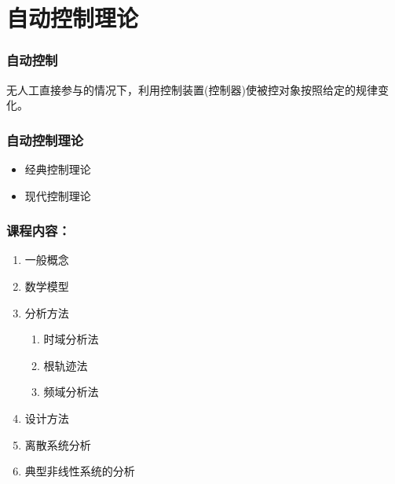 \documentclass{beamer}
\begin{document}
\section{自动控制理论}
\label{sec-2}
\begin{frame}
\frametitle{自动控制}
\label{sec-2-1}

 无人工直接参与的情况下，利用控制装置(控制器)使被控对象按照给定的规律变化。
\end{frame}
\begin{frame}
\frametitle{自动控制理论}
\label{sec-2-2}

\begin{itemize}
\item <2->经典控制理论
\item <3->现代控制理论
\end{itemize}
\end{frame}
\begin{frame}
\frametitle{课程内容：}
\label{sec-2-3}

\begin{enumerate}
\item <2->一般概念
\item <3->数学模型
\item <4->分析方法
\begin{enumerate}
\item 时域分析法
\item 根轨迹法
\item 频域分析法
\end{enumerate}
\item <5->设计方法
\item <6->离散系统分析
\item <7->典型非线性系统的分析
\end{enumerate}
\end{frame}
\end{document}
